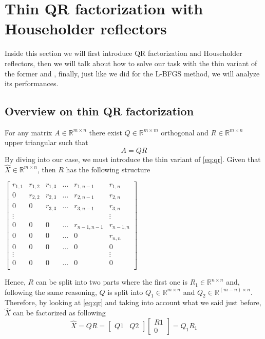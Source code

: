\section{Thin QR factorization with Householder reflectors}
Inside this section we will first introduce QR factorization and Householder reflectors, then we will talk about how to solve our task with the thin variant of the former and , finally, just like we did for the L-BFGS method, we will analyze its performances.

\subsection{Overview on thin QR factorization}
For any matrix $A \in \mathbb{R}^{m\times n}$ there exist $Q \in \mathbb{R}^{m\times m}$ orthogonal and $R \in \mathbb{R}^{m\times n}$ upper triangular such that
\begin{equation}
    A=QR
    \label{eq:qr}
\end{equation}
By diving into our case, we must introduce the thin variant of \eqref{eq:qr}. Given that $\hat{X}\in \mathbb{R}^{m\times n}$, then $R$ has the following structure
\begin{center}
$\begin{bmatrix}
r_{1,1} & r_{1,2} & r_{1,3} & \dots & r_{1,n-1} & r_{1,n} \\
0 & r_{2,2} & r_{2,3} & \dots & r_{2,n-1} & r_{2,n} \\
0 & 0 & r_{3,3} & \dots & r_{3,n-1} & r_{3,n} \\
\vdots & & & & & \vdots \\
0 & 0 & 0 & \dots & r_{n-1,n-1} & r_{n-1,n} \\
0 & 0 & 0 & \dots & 0 & r_{n,n} \\
0 & 0 & 0 & \dots & 0 & 0 \\
\vdots & & & & & \vdots \\
0 & 0 & 0 & \dots & 0 & 0 \\
\end{bmatrix}$
\end{center}
Hence, $R$ can be split into two parts where the first one is $R_1\in \mathbb{R}^{n\times n}$ and, following the same reasoning, $Q$ is split into $Q_1 \in \mathbb{R}^{m\times n}$ and $Q_2 \in \mathbb{R}^{(m-n)\times n}$. Therefore, by looking at \eqref{eq:qr} and taking into account what we said just before, $\hat{X}$ can be factorized as following
\begin{equation}
    \hat{X}=QR=
    \begin{bmatrix}Q1 & Q2\end{bmatrix}\begin{bmatrix}R1 \\ 0\end{bmatrix}=Q_1 R_1
    \label{eq:qr_factorization}
\end{equation}
